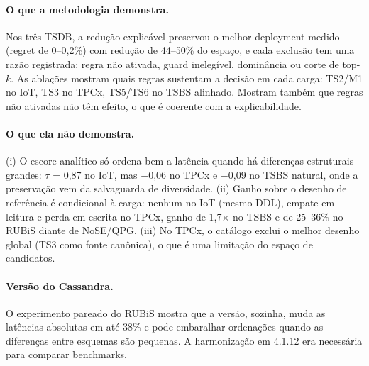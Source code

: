 \documentclass[10pt,a4paper,twoside]{article}
\theoremstyle{definition}\newtheorem{definicao}{Definição}
\begin{document}
\paragraph{O que a metodologia demonstra.} Nos três TSDB, a redução explicável preservou o melhor deployment medido (regret de 0--0,2\%) com redução de 44--50\% do espaço, e cada exclusão tem uma razão registrada: regra não ativada, guard inelegível, dominância ou corte de top-$k$. As ablações mostram quais regras sustentam a decisão em cada carga: TS2/M1 no IoT, TS3 no TPCx, TS5/TS6 no TSBS alinhado. Mostram também que regras não ativadas não têm efeito, o que é coerente com a explicabilidade.

\paragraph{O que ela não demonstra.} (i) O escore analítico só ordena bem a latência quando há diferenças estruturais grandes: $\tau$ = 0,87 no IoT, mas $-$0,06 no TPCx e $-$0,09 no TSBS natural, onde a preservação vem da salvaguarda de diversidade. (ii) Ganho sobre o desenho de referência é condicional à carga: nenhum no IoT (mesmo DDL), empate em leitura e perda em escrita no TPCx, ganho de 1,7$\times$ no TSBS e de 25--36\% no RUBiS diante de NoSE/QPG. (iii) No TPCx, o catálogo exclui o melhor desenho global (TS3 como fonte canônica), o que é uma limitação do espaço de candidatos.

\paragraph{Versão do Cassandra.} O experimento pareado do RUBiS mostra que a versão, sozinha, muda as latências absolutas em até 38\% e pode embaralhar ordenações quando as diferenças entre esquemas são pequenas. A harmonização em 4.1.12 era necessária para comparar benchmarks.

\end{document}
